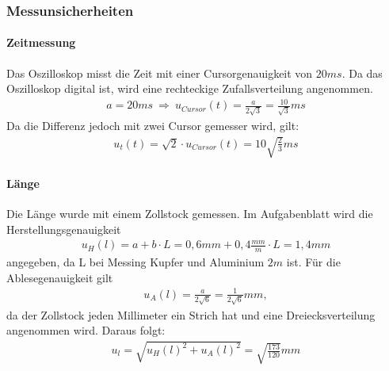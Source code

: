 \documentclass[11pt, a4paper]{article}
\begin{document}
    \subsubsection{Messunsicherheiten}
    \paragraph{Zeitmessung}
    Das Oszilloskop misst die Zeit mit einer Cursorgenauigkeit von $ 20ms $. Da das Oszilloskop digital ist, wird
    eine rechteckige Zufallsverteilung angenommen.
    \begin{align}
        a = 20ms \ \Rightarrow \ u_{Cursor}(t) = \frac{a}{2 \sqrt{3}} = \frac{10}{\sqrt{3}}ms
    \end{align}
    Da die Differenz jedoch mit zwei Cursor gemesser wird, gilt:
    \begin{align} \label{eqt}
        u_{t}(t) = \sqrt{2} \cdot u_{Cursor}(t) = 10\sqrt{\frac{2}{3}}ms
    \end{align}
    \paragraph{Länge}
    Die Länge wurde mit einem Zollstock gemessen. Im Aufgabenblatt wird die Herstellungsgenauigkeit
    \begin{align}
        u_H(l) = a+b \cdot L = 0,6mm + 0,4\frac{mm}{m} \cdot L = 1,4mm
    \end{align}
    angegeben, da L bei Messing Kupfer und Aluminium $2m$ ist.
    Für die Ablesegenauigkeit gilt
    \begin{align}
        u_A(l) = \frac{a}{2\sqrt{6}} = \frac{1}{2\sqrt{6}}mm,
    \end{align}
    da der Zollstock jeden Millimeter ein Strich hat und eine Dreiecksverteilung angenommen wird.
    Daraus folgt:
    \begin{align} \label{eql}
        u_l = \sqrt{u_H(l)^2 + u_A(l)^2} = \sqrt{\frac{173}{120}}mm
    \end{align}
\end{document}
